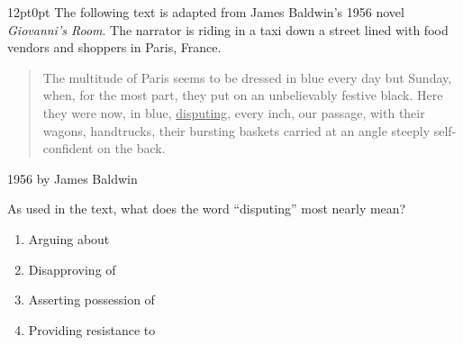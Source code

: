 \documentclass[11pt, twocolumn]{article}
\newcounter{questionnum}
\begin{document}
\vspace{6pt}\noindent
\begin{minipage}{\columnwidth}\raggedright
\noindent{}\par\vspace{8pt}
\begin{adjustwidth}{12pt}{0pt}
The following text is adapted from James Baldwin's 1956 novel \textit{Giovanni's Room}. The narrator is riding in a taxi down a street lined with food vendors and shoppers in Paris, France.

\vspace{6pt}
\begin{quote}

The multitude of Paris seems to be dressed in blue every day but Sunday, when, for the most part, they put on an unbelievably festive black. Here they were now, in blue, \uline{disputing}, every inch, our passage, with their wagons, handtrucks, their bursting baskets carried at an angle steeply self-confident on the back.

\end{quote}

\textcopyright{}1956 by James Baldwin
\vspace{6pt}

As used in the text, what does the word ``disputing'' most nearly mean?
\begin{enumerate}[label=\Alph*),leftmargin=18pt,topsep=3pt,itemsep=2pt]
  \item Arguing about
  \item Disapproving of
  \item Asserting possession of
  \item Providing resistance to
\end{enumerate}
\end{adjustwidth}
\end{minipage}\par
\end{document}
